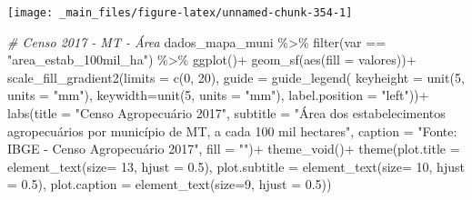 \documentclass[
  brazilian,
]{book}
\newenvironment{Shaded}{\begin{snugshade}}{\end{snugshade}}
\newcommand{\AttributeTok}[1]{\textcolor[rgb]{0.77,0.63,0.00}{#1}}
\newcommand{\CommentTok}[1]{\textcolor[rgb]{0.56,0.35,0.01}{\textit{#1}}}
\newcommand{\DecValTok}[1]{\textcolor[rgb]{0.00,0.00,0.81}{#1}}
\newcommand{\FloatTok}[1]{\textcolor[rgb]{0.00,0.00,0.81}{#1}}
\newcommand{\FunctionTok}[1]{\textcolor[rgb]{0.00,0.00,0.00}{#1}}
\newcommand{\NormalTok}[1]{#1}
\newcommand{\SpecialCharTok}[1]{\textcolor[rgb]{0.00,0.00,0.00}{#1}}
\newcommand{\StringTok}[1]{\textcolor[rgb]{0.31,0.60,0.02}{#1}}
\begin{document}
\begin{center}\texttt{[image: \_main\_files/figure-latex/unnamed-chunk-354-1]} \end{center}

\begin{Shaded}
\begin{Highlighting}[]
\CommentTok{\# Censo 2017 {-} MT {-} Área}
\NormalTok{dados\_mapa\_muni }\SpecialCharTok{\%\textgreater{}\%} 
  \FunctionTok{filter}\NormalTok{(var }\SpecialCharTok{==} \StringTok{"area\_estab\_100mil\_ha"}\NormalTok{) }\SpecialCharTok{\%\textgreater{}\%}
  \FunctionTok{ggplot}\NormalTok{()}\SpecialCharTok{+}
  \FunctionTok{geom\_sf}\NormalTok{(}\FunctionTok{aes}\NormalTok{(}\AttributeTok{fill =}\NormalTok{ valores))}\SpecialCharTok{+}
  \FunctionTok{scale\_fill\_gradient2}\NormalTok{(}\AttributeTok{limits =} \FunctionTok{c}\NormalTok{(}\DecValTok{0}\NormalTok{, }\DecValTok{20}\NormalTok{),}
                       \AttributeTok{guide =} \FunctionTok{guide\_legend}\NormalTok{(}
                         \AttributeTok{keyheight =} \FunctionTok{unit}\NormalTok{(}\DecValTok{5}\NormalTok{, }\AttributeTok{units =} \StringTok{"mm"}\NormalTok{),}
                         \AttributeTok{keywidth=}\FunctionTok{unit}\NormalTok{(}\DecValTok{5}\NormalTok{, }\AttributeTok{units =} \StringTok{"mm"}\NormalTok{),}
                         \AttributeTok{label.position =} \StringTok{"left"}\NormalTok{))}\SpecialCharTok{+}
  \FunctionTok{labs}\NormalTok{(}\AttributeTok{title =} \StringTok{"Censo Agropecuário 2017"}\NormalTok{,}
       \AttributeTok{subtitle =} \StringTok{"Área dos estabelecimentos agropecuários por município de MT, a cada 100 mil hectares"}\NormalTok{,}
       \AttributeTok{caption =} \StringTok{"Fonte: IBGE {-} Censo Agropecuário 2017"}\NormalTok{,}
       \AttributeTok{fill =} \StringTok{""}\NormalTok{)}\SpecialCharTok{+}
  \FunctionTok{theme\_void}\NormalTok{()}\SpecialCharTok{+}
  \FunctionTok{theme}\NormalTok{(}\AttributeTok{plot.title =} \FunctionTok{element\_text}\NormalTok{(}\AttributeTok{size=} \DecValTok{13}\NormalTok{, }\AttributeTok{hjust =} \FloatTok{0.5}\NormalTok{),}
        \AttributeTok{plot.subtitle =} \FunctionTok{element\_text}\NormalTok{(}\AttributeTok{size=} \DecValTok{10}\NormalTok{, }\AttributeTok{hjust =} \FloatTok{0.5}\NormalTok{),}
        \AttributeTok{plot.caption =} \FunctionTok{element\_text}\NormalTok{(}\AttributeTok{size=}\DecValTok{9}\NormalTok{, }\AttributeTok{hjust =} \FloatTok{0.5}\NormalTok{))}
\end{Highlighting}
\end{Shaded}
\end{document}
